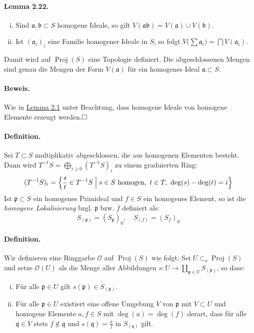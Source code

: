 \documentclass[11pt,b5paper,openany]{memoir}
\def \qed {$\hfill\square$}
\begin{document}
\paragraph{Lemma 2.22.}\label{2.22}\begin{enumerate}[(i)]
\item Sind $\mathfrak{a},\mathfrak{b}\subset S$ homogene Ideale, so gilt $V(\mathfrak{ab})=V(\mathfrak{a})\cup V(\mathfrak{b})$.
\item Ist $(\mathfrak{a}_i)_i$ eine Familie homogener Ideale in $S$, so folgt $V\big(\sum\mathfrak{a}_i\big)=\bigcap V(\mathfrak{a}_i)$.
\end{enumerate}
Damit wird auf $\operatorname{Proj}(S)$ eine Topologie definiert. Die abgeschlossenen Mengen sind genau die Mengen der Form $V(\mathfrak{a})$ für ein homogenes Ideal $\mathfrak{a}\subset S$.

\paragraph{Beweis.} Wie in \hyperref[2.1]{Lemma 2.1} unter Beachtung, dass homogene Ideale von homogene Elemente erzeugt werden.\qed

\paragraph{Definition.} Sei $T\subset S$ multiplikativ abgeschlossen, die aus homogenen Elementen besteht. Dann wird $T^{-1}S = \bigoplus_{i\geq 0} (T^{-1}S)_i$ zu einem graduierten Ring:
\[(T^{-1}S)_i=\Big\{\frac{s}{t}\in T^{-1}S\Bigm| s\in S\text{ homogen},\ t\in T,\ \deg(s)-\deg(t)=i \Big\} \]
Ist $\mathfrak{p}\subset S$ ein homogenes Primideal und $f\in S$ ein homogenes Element, so ist die \textit{homogene Lokalisierung} bzgl. $\mathfrak{p}$ bzw. $f$ definiert als:
\[S_{(\mathfrak{p})} = (S_\mathfrak{p})_0,\quad S_{(f)} = (S_f)_0 \]

\paragraph{Definition.} Wir definieren eine Ringgarbe $\mathcal{O}$ auf $\operatorname{Proj}(S)$ wie folgt: Sei $U\subset_\text{o}\operatorname{Proj}(S)$ und setze $\mathcal{O}(U)$ als die Menge aller Abbildungen $s:U\to\coprod_{\mathfrak{p}\in U}S_{(\mathfrak{p})}$, so dass:
\begin{enumerate}[(i)]
\item Für alle $\mathfrak{p}\in U$ gilt $s(\mathfrak{p})\in S_{(\mathfrak{p})}$.
\item Für alle $\mathfrak{p}\in U$ existiert eine offene Umgebung $V$ von $\mathfrak{p}$ mit $V\subset U$ und homogene Elemente $a,f\in S$ mit $\deg(a)=\deg(f)$ derart, dass für alle $\mathfrak{q}\in V$ stets $f\not\in\mathfrak{q}$ und $s(\mathfrak{q})=\frac{a}{f}$ in $S_{(\mathfrak{q})}$ gilt.
\end{enumerate}
\end{document}

